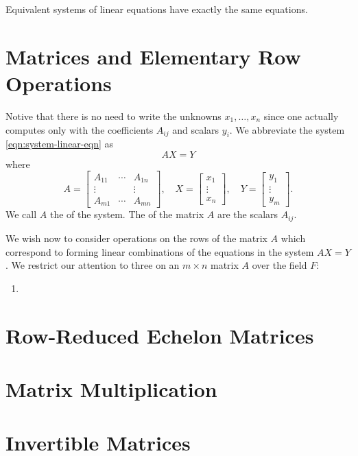 \begin{theorem}
Equivalent systems of linear equations have exactly the same equations.
\end{theorem}

\section{Matrices and Elementary Row Operations}
Notive that there is no need to write the unknowns $x_1,\dots,x_n$ since one actually computes only with the coefficients $A_{ij}$ and scalars $y_i$. We abbreviate the system \ref{eqn:system-linear-eqn} as
\[AX=Y\]
where
\[A=\begin{bmatrix}
A_{11}&\cdots&A_{1n}\\
\vdots&&\vdots\\
A_{m1}&\cdots&A_{mn}
\end{bmatrix},\quad X=\begin{bmatrix}
x_1\\\vdots\\x_n
\end{bmatrix},\quad Y=\begin{bmatrix}
y_1\\\vdots\\y_m
\end{bmatrix}.\]
We call $A$ the  of the system. The  of the matrix $A$ are the scalars $A_{ij}$.

We wish now to consider operations on the rows of the matrix $A$ which correspond to forming linear combinations of the equations in the system $AX=Y$. We restrict our attention to three  on an $m\times n$ matrix $A$ over the field $F$:
\begin{enumerate}
\item 
\end{enumerate}

\section{Row-Reduced Echelon Matrices}
\section{Matrix Multiplication}
\section{Invertible Matrices}